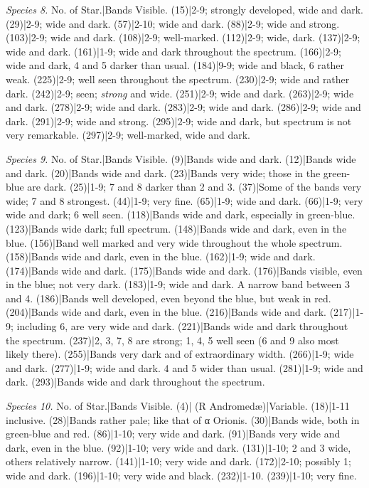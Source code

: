 \documentclass[a4paper, 12pt, oneside, polutonikogreek, english]{article}
\begin{document}
\emph{Species 8.} 
No. of Star.|Bands Visible. 
(15)|2-9; strongly developed, wide and dark. 
(29)|2-9; wide and dark. 
(57)|2-10; wide and dark. 
(88)|2-9; wide and strong. 
(103)|2-9; wide and dark. 
(108)|2-9; well-marked. 
(112)|2-9; wide, dark. 
(137)|2-9; wide and dark. 
(161)|1-9; wide and dark throughout the spectrum. 
(166)|2-9; wide and dark, 4 and 5 darker than usual. 
(184)|9-9; wide and black, 6 rather weak. 
(225)|2-9; well seen throughout the spectrum. 
(230)|2-9; wide and rather dark. 
(242)|2-9; seen; \emph{strong} and wide. 
(251)|2-9; wide and dark. 
(263)|2-9; wide and dark. 
(278)|2-9; wide and dark. 
(283)|2-9; wide and dark. 
(286)|2-9; wide and dark. 
(291)|2-9; wide and strong. 
(295)|2-9; wide and dark, but spectrum is not very remarkable. 
(297)|2-9; well-marked, wide and dark. 

\emph{Species 9.} 
No. of Star.|Bands Visible. 
(9)|Bands wide and dark. 
(12)|Bands wide and dark. 
(20)|Bands wide and dark. 
(23)|Bands very wide; those in the green-blue are dark. 
(25)|1-9; 7 and 8 darker than 2 and 3. 
(37)|Some of the bands very wide; 7 and 8 strongest. 
(44)|1-9; very fine. 
(65)|1-9; wide and dark. 
(66)|1-9; very wide and dark; 6 well seen. 
(118)|Bands wide and dark, especially in green-blue. 
(123)|Bands wide dark; full spectrum. 
(148)|Bands wide and dark, even in the blue. 
(156)|Band well marked and very wide throughout the whole spectrum. 
(158)|Bands wide and dark, even in the blue. 
(162)|1-9; wide and dark. 
(174)|Bands wide and dark. 
(175)|Bands wide and dark. 
(176)|Bands visible, even in the blue; not very dark. 
(183)|1-9; wide and dark. A narrow band between 3 and 4. 
(186)|Bands well developed, even beyond the blue, but weak in red. 
(204)|Bands wide and dark, even in the blue. 
(216)|Bands wide and dark. 
(217)|1-9; including 6, are very wide and dark. 
(221)|Bands wide and dark throughout the spectrum. 
(237)|2, 3, 7, 8 are strong; 1, 4, 5 well seen (6 and 9 also most likely there). 
(255)|Bands very dark and of extraordinary width. 
(266)|1-9; wide and dark. 
(277)|1-9; wide and dark. 4 and 5 wider than usual. 
(281)|1-9; wide and dark. 
(293)|Bands wide and dark throughout the spectrum. 

\emph{Species 10.} 
No. of Star.|Bands Visible. 
(4)| 
(R Andromedæ)|Variable. 
(18)|1-11 inclusive. 
(28)|Bands rather pale; like that of α Orionis. 
(30)|Bands wide, both in green-blue and red. 
(86)|1-10; very wide and dark. 
(91)|Bands very wide and dark, even in the blue. 
(92)|1-10; very wide and dark. 
(131)|1-10; 2 and 3 wide, others relatively narrow. 
(141)|1-10; very wide and dark. 
(172)|2-10; possibly 1; wide and dark. 
(196)|1-10; very wide and black. 
(232)|1-10. 
(239)|1-10; very fine. 
\end{document}
